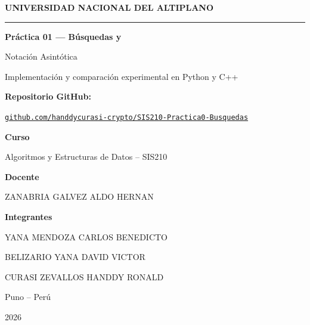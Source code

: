 \documentclass[10pt,a4paper]{article}
\begin{document}
\hypersetup{pageanchor=false}\begin{titlepage}
\centering
\vspace*{1.7cm}
{\Large\bfseries UNIVERSIDAD NACIONAL DEL ALTIPLANO\par}
\vspace{.3cm}{\Large Puno\par}
\vspace{.7cm}{\large Escuela Profesional de Ingeniería de Sistemas\par}
\vspace{1.9cm}
{\color{azul}\rule{\textwidth}{1pt}\par}
\vspace{.5cm}
{\LARGE\bfseries Práctica 01 — Búsquedas y\par Notación Asintótica\par}
\vspace{.4cm}
{\large Implementación y comparación experimental en Python y C++\par}
\vspace{.35cm}
{\normalsize\textbf{Repositorio GitHub:}\par}
\href{https://github.com/handdycurasi-crypto/SIS210-Practica0-Busquedas}{\texttt{github.com/handdycurasi-crypto/SIS210-Practica0-Busquedas}}\par
\vspace{.5cm}{\color{azul}\rule{\textwidth}{1pt}\par}
\vspace{1.5cm}
{\large\textbf{Curso}\par Algoritmos y Estructuras de Datos -- SIS210\par}
\vspace{.8cm}
{\large\textbf{Docente}\par ZANABRIA GALVEZ ALDO HERNAN\par}
\vspace{.8cm}
{\large\textbf{Integrantes}\par}
\vspace{.2cm}
YANA MENDOZA CARLOS BENEDICTO\par
BELIZARIO YANA DAVID VICTOR\par
CURASI ZEVALLOS HANDDY RONALD\par
\vfill
{\large Puno -- Perú\par 2026\par}
\vspace{.5cm}
\end{titlepage}
\hypersetup{pageanchor=true}\setcounter{page}{1}
\tableofcontents\clearpage

\end{document}

